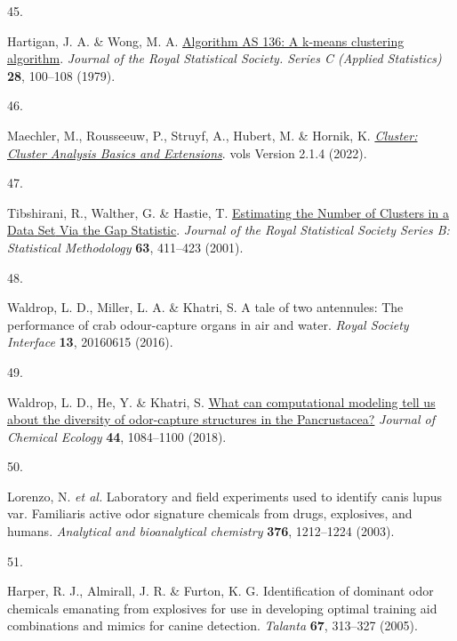 \documentclass[
]{article}
\newlength{\cslhangindent}
\newlength{\csllabelwidth}
\newlength{\cslentryspacingunit} %
\newenvironment{CSLReferences}[2] %
 {%
  \setlength{\parindent}{0pt}
  \ifodd #1
  \let\oldpar\par
  \def\par{\hangindent=\cslhangindent\oldpar}
  \fi
  \setlength{\parskip}{#2\cslentryspacingunit}
 }%
 {}
\newcommand{\CSLLeftMargin}[1]{\parbox[t]{\csllabelwidth}{#1}}
\newcommand{\CSLRightInline}[1]{\parbox[t]{\linewidth - \csllabelwidth}{#1}\break}
\begin{document}
\begin{CSLReferences}{0}{0}
\leavevmode{}%
\CSLLeftMargin{45. }%
\CSLRightInline{Hartigan, J. A. \& Wong, M. A. \href{http://www.jstor.org/stable/2346830}{Algorithm AS 136: A k-means clustering algorithm}. \emph{Journal of the Royal Statistical Society. Series C (Applied Statistics)} \textbf{28}, 100--108 (1979).}

\leavevmode{}%
\CSLLeftMargin{46. }%
\CSLRightInline{Maechler, M., Rousseeuw, P., Struyf, A., Hubert, M. \& Hornik, K. \emph{\href{https://CRAN.R-project.org/package=cluster}{Cluster: Cluster Analysis Basics and Extensions}}. vols Version 2.1.4 (2022).}

\leavevmode{}%
\CSLLeftMargin{47. }%
\CSLRightInline{Tibshirani, R., Walther, G. \& Hastie, T. \href{https://doi.org/10.1111/1467-9868.00293}{Estimating the {Number} of {Clusters} in a {Data} {Set} {Via} the {Gap} {Statistic}}. \emph{Journal of the Royal Statistical Society Series B: Statistical Methodology} \textbf{63}, 411--423 (2001).}

\leavevmode{}%
\CSLLeftMargin{48. }%
\CSLRightInline{Waldrop, L. D., Miller, L. A. \& Khatri, S. A tale of two antennules: The performance of crab odour-capture organs in air and water. \emph{Royal Society Interface} \textbf{13}, 20160615 (2016).}

\leavevmode{}%
\CSLLeftMargin{49. }%
\CSLRightInline{Waldrop, L. D., He, Y. \& Khatri, S. \href{https://doi.org/10.1007/s10886-018-1017-2}{What can computational modeling tell us about the diversity of odor-capture structures in the {P}ancrustacea?} \emph{Journal of Chemical Ecology} \textbf{44}, 1084--1100 (2018).}

\leavevmode{}%
\CSLLeftMargin{50. }%
\CSLRightInline{Lorenzo, N. \emph{et al.} Laboratory and field experiments used to identify canis lupus var. Familiaris active odor signature chemicals from drugs, explosives, and humans. \emph{Analytical and bioanalytical chemistry} \textbf{376}, 1212--1224 (2003).}

\leavevmode{}%
\CSLLeftMargin{51. }%
\CSLRightInline{Harper, R. J., Almirall, J. R. \& Furton, K. G. Identification of dominant odor chemicals emanating from explosives for use in developing optimal training aid combinations and mimics for canine detection. \emph{Talanta} \textbf{67}, 313--327 (2005).}


\end{CSLReferences}
\end{document}
